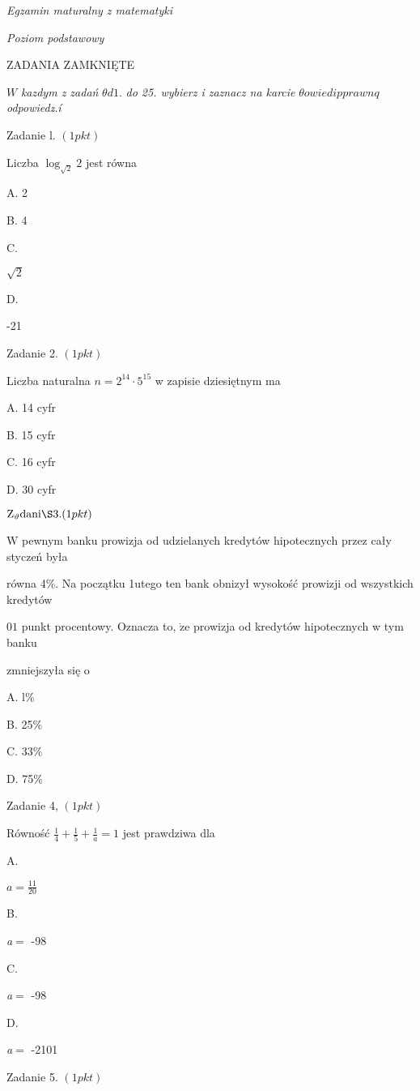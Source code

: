 \documentclass[a4paper,12pt]{article}
\begin{document}
{\it Egzamin maturalny z matematyki}

{\it Poziom podstawowy}

ZADANIA ZAMKNIĘTE

$W$ {\it kazdym z zadań} $\theta d1.$ {\it do 25. wybierz i zaznacz na karcie} $\theta owiedipprawnq$ {\it odpowiedz}$\acute{}$.{\it í}

Zadanie l. $(1pkt)$

Liczba $\log_{\sqrt{2}}2$ jest równa

A. 2

B. 4

C.

$\sqrt{2}$

D.

-21

Zadanie 2. $(1pkt)$

Liczba naturalna $n=2^{14}\cdot 5^{15}$ w zapisie dziesiętnym ma

A. 14 cyfr

B. 15 cyfr

C. 16 cyfr

D. 30 cyfr

$\mathrm{Z}_{\vartheta}\mathrm{d}\mathrm{a}\mathrm{n}\mathrm{i}\S 3. (1pkt)$

$\mathrm{W}$ pewnym banku prowizja od udzielanych kredytów hipotecznych przez cały styczeń była

równa 4\%. Na początku 1utego ten bank obnizył wysokość prowizji od wszystkich kredytów

$0 1$ punkt procentowy. Oznacza to, $\dot{\mathrm{z}}\mathrm{e}$ prowizja od kredytów hipotecznych w tym banku

zmniejszyła się o

A. l\%

B. 25\%

C. 33\%

D. 75\%

Zadanie 4, $(1pkt)$

Równość $\displaystyle \frac{1}{4}+\frac{1}{5}+\frac{1}{a}=1$ jest prawdziwa dla

A.

$a=\displaystyle \frac{11}{20}$

B.

{\it a}$=$ -98

C.

{\it a}$=$ -98

D.

{\it a}$=$ -2101

Zadanie 5. $(1pkt)$
\end{document}
